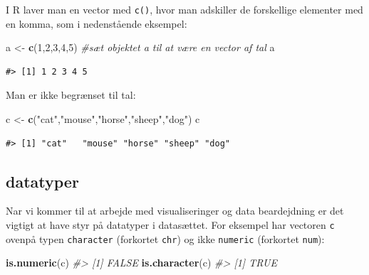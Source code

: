 \documentclass[
]{book}
\newenvironment{Shaded}{\begin{snugshade}}{\end{snugshade}}
\newcommand{\CommentTok}[1]{\textcolor[rgb]{0.37,0.37,0.37}{\textit{#1}}}
\newcommand{\DecValTok}[1]{\textcolor[rgb]{0.06,0.06,0.06}{#1}}
\newcommand{\FunctionTok}[1]{\textcolor[rgb]{0.27,0.27,0.27}{\textbf{#1}}}
\newcommand{\NormalTok}[1]{#1}
\newcommand{\OtherTok}[1]{\textcolor[rgb]{0.37,0.37,0.37}{#1}}
\newcommand{\StringTok}[1]{\textcolor[rgb]{0.5,0.5,0.5}{#1}}
\begin{document}
I R laver man en vector med \texttt{c()}, hvor man adskiller de forskellige elementer med en komma, som i nedenstående eksempel:

\begin{Shaded}
\begin{Highlighting}[]
\NormalTok{a }\OtherTok{\textless{}{-}} \FunctionTok{c}\NormalTok{(}\DecValTok{1}\NormalTok{,}\DecValTok{2}\NormalTok{,}\DecValTok{3}\NormalTok{,}\DecValTok{4}\NormalTok{,}\DecValTok{5}\NormalTok{) }\CommentTok{\#sæt objektet \textquotesingle{}a\textquotesingle{} til at være en vector af tal }
\NormalTok{a}
\end{Highlighting}
\end{Shaded}

\begin{verbatim}
#> [1] 1 2 3 4 5
\end{verbatim}

Man er ikke begrænset til tal:

\begin{Shaded}
\begin{Highlighting}[]
\NormalTok{c }\OtherTok{\textless{}{-}} \FunctionTok{c}\NormalTok{(}\StringTok{"cat"}\NormalTok{,}\StringTok{"mouse"}\NormalTok{,}\StringTok{"horse"}\NormalTok{,}\StringTok{"sheep"}\NormalTok{,}\StringTok{"dog"}\NormalTok{)}
\NormalTok{c}
\end{Highlighting}
\end{Shaded}

\begin{verbatim}
#> [1] "cat"   "mouse" "horse" "sheep" "dog"
\end{verbatim}

\subsection{datatyper}\label{datatyper}

Nar vi kommer til at arbejde med visualiseringer og data beardejdning er det vigtigt at have styr på datatyper i datasættet. For eksempel har vectoren \texttt{c} ovenpå typen \texttt{character} (forkortet \texttt{chr}) og ikke \texttt{numeric} (forkortet \texttt{num}):

\begin{Shaded}
\begin{Highlighting}[]
\FunctionTok{is.numeric}\NormalTok{(c)}
\CommentTok{\#\textgreater{} [1] FALSE}
\FunctionTok{is.character}\NormalTok{(c)}
\CommentTok{\#\textgreater{} [1] TRUE}
\end{Highlighting}
\end{Shaded}
\end{document}
